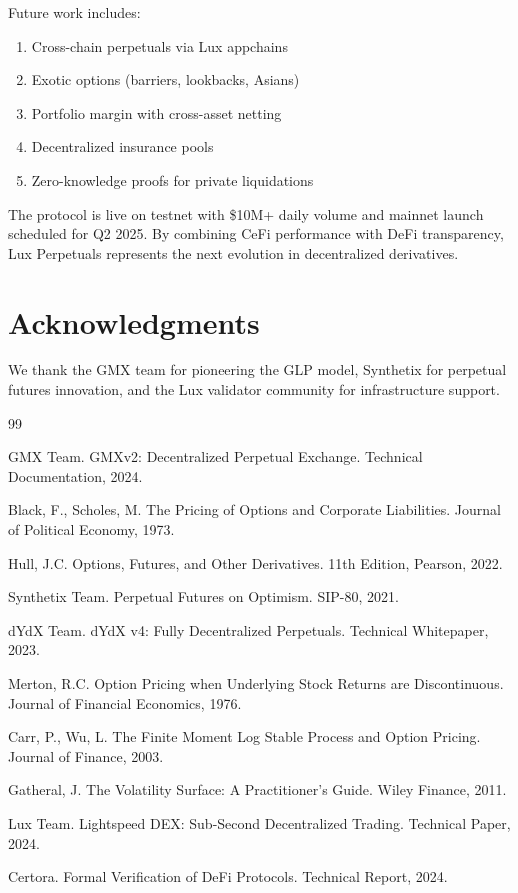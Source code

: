 \documentclass[11pt,a4paper]{article}
\begin{document}
Future work includes:
\begin{enumerate}
    \item Cross-chain perpetuals via Lux appchains
    \item Exotic options (barriers, lookbacks, Asians)
    \item Portfolio margin with cross-asset netting
    \item Decentralized insurance pools
    \item Zero-knowledge proofs for private liquidations
\end{enumerate}

The protocol is live on testnet with \$10M+ daily volume and mainnet launch scheduled for Q2 2025. By combining CeFi performance with DeFi transparency, Lux Perpetuals represents the next evolution in decentralized derivatives.

\section*{Acknowledgments}

We thank the GMX team for pioneering the GLP model, Synthetix for perpetual futures innovation, and the Lux validator community for infrastructure support.


\begin{thebibliography}{99}

GMX Team. GMXv2: Decentralized Perpetual Exchange. Technical Documentation, 2024.

Black, F., Scholes, M. The Pricing of Options and Corporate Liabilities. Journal of Political Economy, 1973.

Hull, J.C. Options, Futures, and Other Derivatives. 11th Edition, Pearson, 2022.

Synthetix Team. Perpetual Futures on Optimism. SIP-80, 2021.

dYdX Team. dYdX v4: Fully Decentralized Perpetuals. Technical Whitepaper, 2023.

Merton, R.C. Option Pricing when Underlying Stock Returns are Discontinuous. Journal of Financial Economics, 1976.

Carr, P., Wu, L. The Finite Moment Log Stable Process and Option Pricing. Journal of Finance, 2003.

Gatheral, J. The Volatility Surface: A Practitioner's Guide. Wiley Finance, 2011.

Lux Team. Lightspeed DEX: Sub-Second Decentralized Trading. Technical Paper, 2024.

Certora. Formal Verification of DeFi Protocols. Technical Report, 2024.

\end{thebibliography}
\end{document}
